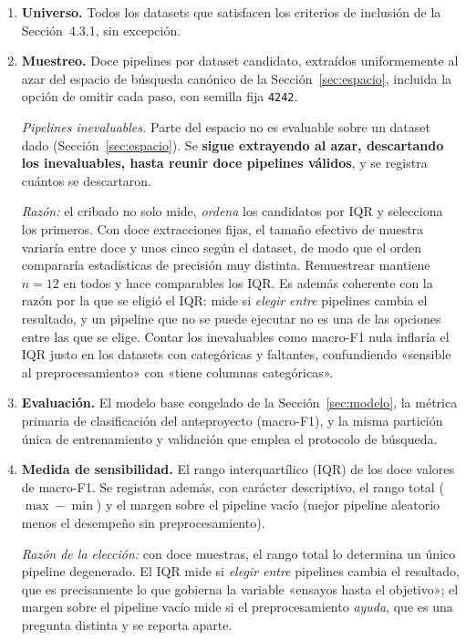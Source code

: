 \documentclass[11pt,letterpaper]{article}
\begin{document}
\begin{enumerate}
  \item \textbf{Universo.} Todos los datasets que satisfacen los criterios de
        inclusión de la Sección~4.3.1, sin excepción.

  \item \textbf{Muestreo.} Doce pipelines por dataset candidato, extraídos
        uniformemente al azar del espacio de búsqueda canónico de la
        Sección~\ref{sec:espacio}, incluida la opción de omitir cada paso, con
        semilla fija \texttt{4242}.

        \textit{Pipelines inevaluables.} Parte del espacio no es evaluable sobre
        un dataset dado (Sección~\ref{sec:espacio}). Se \textbf{sigue extrayendo
        al azar, descartando los inevaluables, hasta reunir doce pipelines
        válidos}, y se registra cuántos se descartaron.

        \textit{Razón:} el cribado no solo mide, \emph{ordena} los candidatos por
        IQR y selecciona los primeros. Con doce extracciones fijas, el tamaño
        efectivo de muestra variaría entre doce y unos cinco según el dataset, de
        modo que el orden compararía estadísticas de precisión muy distinta.
        Remuestrear mantiene $n = 12$ en todos y hace comparables los IQR. Es
        además coherente con la razón por la que se eligió el IQR: mide si
        \emph{elegir entre} pipelines cambia el resultado, y un pipeline que no
        se puede ejecutar no es una de las opciones entre las que se elige.
        Contar los inevaluables como macro-F1 nula inflaría el IQR justo en los
        datasets con categóricas y faltantes, confundiendo «sensible al
        preprocesamiento» con «tiene columnas categóricas».

  \item \textbf{Evaluación.} El modelo base congelado de la
        Sección~\ref{sec:modelo}, la métrica primaria de clasificación del
        anteproyecto (macro-F1), y la misma partición única de entrenamiento y
        validación que emplea el protocolo de búsqueda.

  \item \textbf{Medida de sensibilidad.} El rango interquartílico (IQR) de los
        doce valores de macro-F1. Se registran además, con carácter descriptivo,
        el rango total ($\max - \min$) y el margen sobre el pipeline vacío
        (mejor pipeline aleatorio menos el desempeño sin preprocesamiento).

        \textit{Razón de la elección:} con doce muestras, el rango total lo
        determina un único pipeline degenerado. El IQR mide si \emph{elegir
        entre} pipelines cambia el resultado, que es precisamente lo que
        gobierna la variable «ensayos hasta el objetivo»; el margen sobre el
        pipeline vacío mide si el preprocesamiento \emph{ayuda}, que es una
        pregunta distinta y se reporta aparte.


\end{enumerate}
\end{document}

